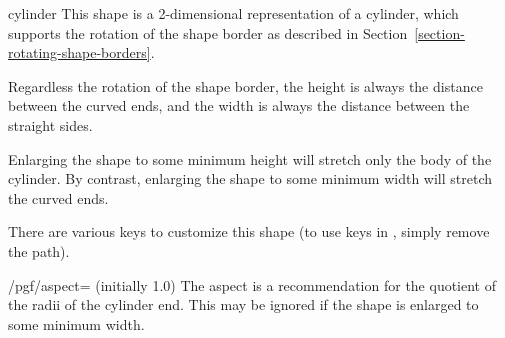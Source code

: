 \begin{shape}{cylinder}
    This shape is a 2-dimensional representation of a cylinder, which supports
    the rotation of the shape border as described in
    Section~\ref{section-rotating-shape-borders}.
\begin{codeexample}[preamble={\usetikzlibrary{shapes.geometric}}]
\end{codeexample}

    Regardless the rotation of the shape border, the height is always the
    distance between the curved ends, and the width is always the distance
    between the straight sides.
\begin{codeexample}[preamble={\usetikzlibrary{shapes.geometric}}]
\end{codeexample}

    Enlarging the shape to some minimum height will stretch only the body of
    the cylinder. By contrast, enlarging the shape to some minimum width will
    stretch the curved ends.
\begin{codeexample}[preamble={\usetikzlibrary{shapes.geometric}}]
\end{codeexample}

    There are various keys to customize this shape (to use \pgfname{} keys in
    \tikzname{}, simply remove the  path).

    \begin{key}{/pgf/aspect= (initially 1.0)}
        The aspect is a recommendation for the quotient of the radii of the
        cylinder end. This may be ignored if the shape is enlarged to some
        minimum width.
\begin{codeexample}[preamble={\usetikzlibrary{shapes.geometric}}]
\end{codeexample}
    \end{key}


\end{shape}
